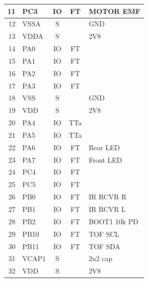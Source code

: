 \documentclass[openbib,letterpaper,10pt]{article}
\begin{document}
\begin{spacing}{1.15}
\begin{appendix}
\begin{singlespacing}
\begin{center}
\begin{longtable}{|r|l|c|c|l|}
			11 & PC3 & IO & FT & MOTOR EMF \\ \hline

			12 & VSSA & S & & GND \\ \hline

			13 & VDDA & S & & 2V8 \\ \hline

			14 & PA0 & IO & FT & \\ \hline

			15 & PA1 & IO & FT & \\ \hline

			16 & PA2 & IO & FT & \\ \hline

			17 & PA3 & IO & FT & \\ \hline

			18 & VSS & S & & GND \\ \hline

			19 & VDD & S & & 2V8 \\ \hline

			20 & PA4 & IO & TTa & \\ \hline

			21 & PA5 & IO & TTa & \\ \hline

			22 & PA6 & IO & FT & Rear LED \\ \hline

			23 & PA7 & IO & FT & Front LED \\ \hline

			24 & PC4 & IO & FT & \\ \hline

			25 & PC5 & IO & FT & \\ \hline

			26 & PB0 & IO & FT & IR RCVR R \\ \hline

			27 & PB1 & IO & FT & IR RCVR L \\ \hline

			28 & PB2 & IO & FT & BOOT1 10k PD \\ \hline

			29 & PB10 & IO & FT & TOF SCL \\ \hline

			30 & PB11 & IO & FT & TOF SDA \\ \hline

			31 & VCAP1 & S & & 2u2 cap \\ \hline

			32 & VDD & S & & 2V8 \\ \hline


\end{longtable}
\end{center}
\end{singlespacing}
\end{appendix}
\end{spacing}
\end{document}
